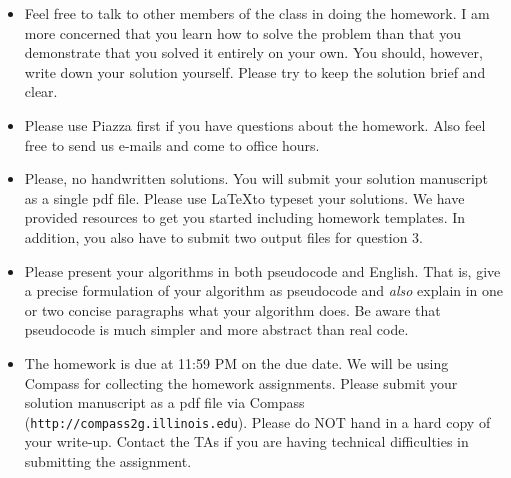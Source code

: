 
\usepackage{graphicx,amssymb,amsmath}
\sloppy
\newcommand{\ignore}[1]{}

\oddsidemargin 0in
\evensidemargin 0in
\textwidth 6.5in
\topmargin -0.5in
\textheight 9.0in




\begin{footnotesize}
\begin{itemize}
\item Feel free to talk to other members of the class in doing the homework.  I am
more concerned that you learn how to solve the problem than that you
demonstrate that you solved it entirely on your own.  You should, however,
write down your solution yourself.  Please try to keep the solution brief and
clear.

\item Please use Piazza first if you have questions about the homework.
  Also feel free to send us e-mails and come to office hours.

\item Please, no handwritten solutions. You will submit your solution 
  manuscript as a single pdf file. Please use \LaTeX to typeset your solutions.
  We have provided resources to get you started including homework templates. 
  In addition, you also have to submit two output files for question 3.

\item Please present your algorithms in both pseudocode and English.  That is, give
a precise formulation of your algorithm as pseudocode and {\em also} explain
in one or two concise paragraphs what your algorithm does.  Be aware that
pseudocode is much simpler and more abstract than real code.

\item The homework is due at 11:59 PM on the due date. We will be using
Compass for collecting the homework assignments. Please submit your solution manuscript as a pdf file via Compass 
(\texttt{http://compass2g.illinois.edu}). Please do NOT hand in a hard copy of your write-up.
Contact the TAs if you are having technical difficulties in 
submitting the assignment. 
\end{itemize}
\end{footnotesize}


